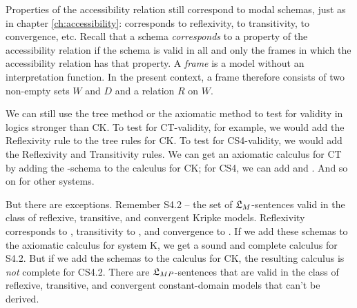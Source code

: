 Properties of the accessibility relation still correspond to modal schemas, just
as in chapter \ref{ch:accessibility}:  corresponds to reflexivity, 
to transitivity,  to convergence, etc. Recall that a schema
\emph{corresponds} to a property of the accessibility relation if the schema is
valid in all and only the frames in which the accessibility relation has that
property. A \emph{frame} is a model without an interpretation function. In the
present context, a frame therefore consists of two non-empty sets $W$ and $D$ and a
relation $R$ on $W$.

We can still use the tree method or the axiomatic method to test for validity in
logics stronger than CK. To test for CT-validity, for example, we would add the
Reflexivity rule to the tree rules for CK. To test for CS4-validity, we would
add the Reflexivity and Transitivity rules. We can get an axiomatic calculus for
CT by adding the -schema to the calculus for CK; for CS4, we can add
 and . And so on for other systems.


But there are exceptions. Remember S4.2 -- the set of $\mathfrak{L}_M$-sentences valid in
the class of reflexive, transitive, and convergent Kripke models. Reflexivity
corresponds to , transitivity to , and convergence to . If we
add these schemas to the axiomatic calculus for system K, we get a sound and
complete calculus for S4.2. But if we add the schemas to the calculus for CK,
the resulting calculus is \emph{not} complete for CS4.2. There are
$\mathfrak{L}_{MP}$-sentences that are valid in the class of reflexive, transitive, and
convergent constant-domain models that can't be derived.

%
%
%
%

